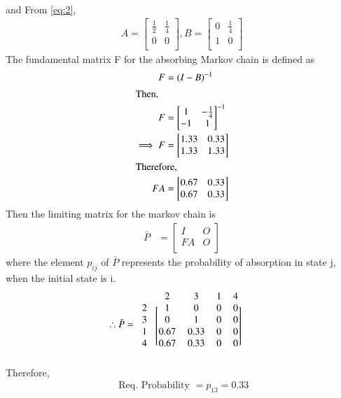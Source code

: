 \documentclass[journal,12pt,twocolumn]{IEEEtran}
\begin{document}
\\and From \eqref{eq:2},
\begin{align}
\label{eq:3}
    A=\begin{bmatrix}
    \frac{1}{2} & \frac{1}{4}\\
    0 & 0\\
    \end{bmatrix},
    B=\begin{bmatrix}
    0 & \frac{1}{4} \\
    1 & 0 \\
    \end{bmatrix}
\end{align}
The fundamental matrix F for the absorbing Markov chain is defined as 
\begin{align}
    F &=(I-B)^{-1} \label{eq:4}\\
\shortintertext{Then,  }
    F &= \begin{bmatrix}
    1 & -\frac{1}{4} \\
    -1 & 1 \\ 
    \end{bmatrix}^{-1} \\
    \implies F &= \begin{bmatrix}
               1.33 & 0.33 \\
               1.33 & 1.33 \\ 
               \end{bmatrix}\\
\shortintertext{Therefore,}
    FA &= \begin{bmatrix}
    0.67 & 0.33 \\
    0.67 & 0.33 \\ 
    \end{bmatrix}
    \end{align}
Then the limiting matrix for the markov chain is 
\begin{align}
\label{eq:5}
    \bar P&=\begin{bmatrix}
    I & O\\
    FA & O\\
    \end{bmatrix}
\end{align}
where the element $p_{ij}$ of $\bar P$ represents the probability of absorption in state j, when the initial state is i.
\begin{align}
  \therefore \bar P&=\begin{blockarray}{ccccc}
                  & 2 & 3 & 1 & 4 \\
                  \begin{block}{c[cccc]}
                  2 & 1 & 0 & 0 & 0  \\
                  3 & 0 & 1 & 0 & 0 \\ 
                  1 & 0.67 & 0.33 & 0 & 0 \\
                  4 & 0.67 & 0.33 & 0 & 0 \\
                \end{block}
                \end{blockarray}  
\end{align}
Therefore,
\begin{align}
    \text{ Req. Probability }= p_{13} = 0.33
\end{align}
\end{document}
